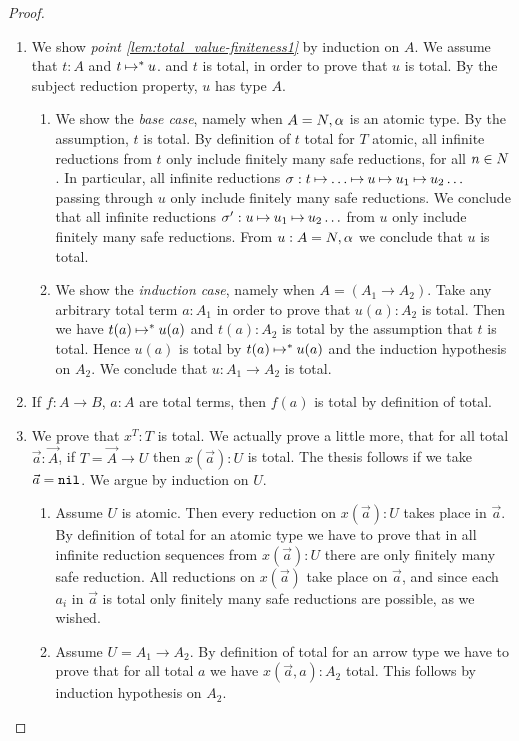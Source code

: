\begin{proof}
\begin{enumerate}

\item
  We show \emph{point \ref{lem:total_value-finiteness1}}  by induction on $A$. 
  We assume that $t:A$ and $t \mathbin{\mapsto} ^*u$.
    and $t$ is total, in order to prove that $u$ is total.
 By the subject reduction property, $u$ has type $A$.
\begin{enumerate}
\item
  We show the \emph{base case}, namely when $A ={N},\alpha$ is an atomic type.
  By the assumption, $t$ is total.
  By definition of $t$ total for $T$ atomic, all infinite 
  reductions from $t$ only include finitely many safe reductions, for all $n \in {N}$.
  In particular, all infinite reductions $\sigma: t \mathbin{\mapsto} \ldots \mathbin{\mapsto} 
  u \mathbin{\mapsto} u_1 \mathbin{\mapsto} u_2 \ldots$ 
  passing through $u$ only include finitely many safe reductions. We conclude that
  all infinite reductions 
  $\sigma': u \mathbin{\mapsto} u_1 \mathbin{\mapsto} u_2 \ldots$  from $u$
  only include finitely many safe reductions. From $u:A ={N},\alpha$ we conclude that  $u$ is total.
\item
  We show the \emph{induction case}, namely when $A = (A_1\rightarrow A_2)$.
  Take any arbitrary total term $a:A_1$ in order to prove that $u(a):A_2$ is total. 
  Then we have $t(a) \mathbin{\mapsto}^* u(a)$ and 
  $t(a):A_2$ is total by the assumption that $t$ is total.
  Hence $u(a)$ is total by $t(a) \mathbin{\mapsto}^* u(a)$ and the induction hypothesis on $A_2$. 
  We conclude that $u:A_1\rightarrow A_2$ is total. 
\end{enumerate}

  \item
If $f:A \rightarrow B$, $a:A$ are total  terms, then $f(a)$  is total by definition of total.

\item
We prove that $x^T:T$ is total. 
We actually prove a little more, 
that for all total $\vec{a}:\vec{A}$, if $T = \vec{A} \rightarrow U$ then $x(\vec{a}):U$
is total. The thesis follows if we take $\vec{a} = {\tt nil}$. We argue by induction on $U$. 

\begin{enumerate}
\item
Assume $U$ is atomic. Then every reduction on $x(\vec{a}):U$
takes place in $\vec{a}$. By definition of total
for an atomic type we have to prove that in all infinite reduction sequences from $x(\vec{a}):U$ 
there are only finitely many safe reduction. All reductions on $x(\vec{a})$ take place on $\vec{a}$,
and since each $a_i$ in $\vec{a}$ is total only finitely many safe reductions are possible, as we wished.
\item
Assume $U = A_1 \to A_2$. By definition of total
for an arrow type we have to prove that for all total $a$ we have  $x(\vec{a},a):A_2$ total.
This follows by induction hypothesis on $A_2$.
\end{enumerate}


\end{enumerate}
\end{proof}
